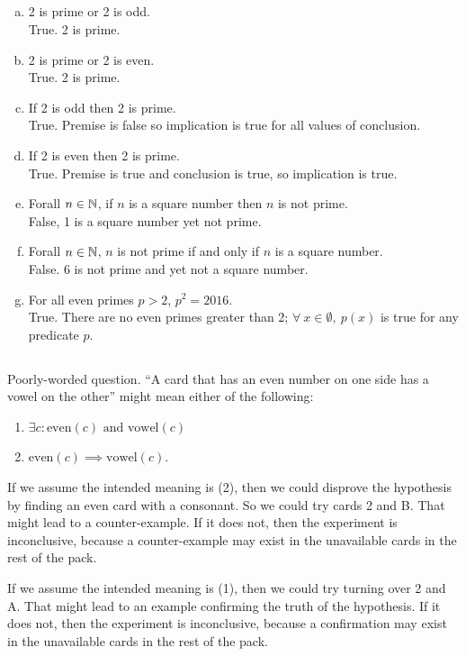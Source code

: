 \documentclass[12pt]{article}
\begin{document}
\subsection{}
\begin{mdframed}
  \begin{enumerate}[(a)]
  \item 2 is prime or 2 is odd.\\
    True. 2 is prime.
  \item 2 is prime or 2 is even.\\
    True. 2 is prime.
  \item If 2 is odd then 2 is prime.\\
    True. Premise is false so implication is true for all values of conclusion.
  \item If 2 is even then 2 is prime.\\
    True. Premise is true and conclusion is true, so implication is true.
  \item Forall $n \in \mathbb{N}$, if $n$ is a square number then $n$ is not prime.\\
    False, 1 is a square number yet not prime.
  \item Forall $n \in \mathbb{N}$, $n$ is not prime if and only if $n$ is a square number.\\
    False. 6 is not prime and yet not a square number.
  \item For all even primes $p > 2$, $p^2 = 2016$.\\
    True. There are no even primes greater than 2;
    $\forall ~ x \in \emptyset, ~p(x)$ is true for any predicate $p$.
  \end{enumerate}
\end{mdframed}


\subsection{}
\begin{mdframed}
Poorly-worded question. ``A card that has an even number on one side has a
vowel on the other'' might mean either of the following:
\begin{enumerate}
\item $\exists c: \text{even}(c) \text{~and~} \text{vowel}(c)$
\item $\text{even}(c) \implies \text{vowel}(c)$.
\end{enumerate}
If we assume the intended meaning is (2), then we could disprove the hypothesis
by finding an even card with a consonant. So we could try cards 2 and B. That
might lead to a counter-example. If it does not, then the experiment is
inconclusive, because a counter-example may exist in the unavailable cards in
the rest of the pack.

If we assume the intended meaning is (1), then we could try turning over 2 and
A. That might lead to an example confirming the truth of the hypothesis. If it
does not, then the experiment is inconclusive, because a confirmation may exist
in the unavailable cards in the rest of the pack.
\end{mdframed}
\end{document}
